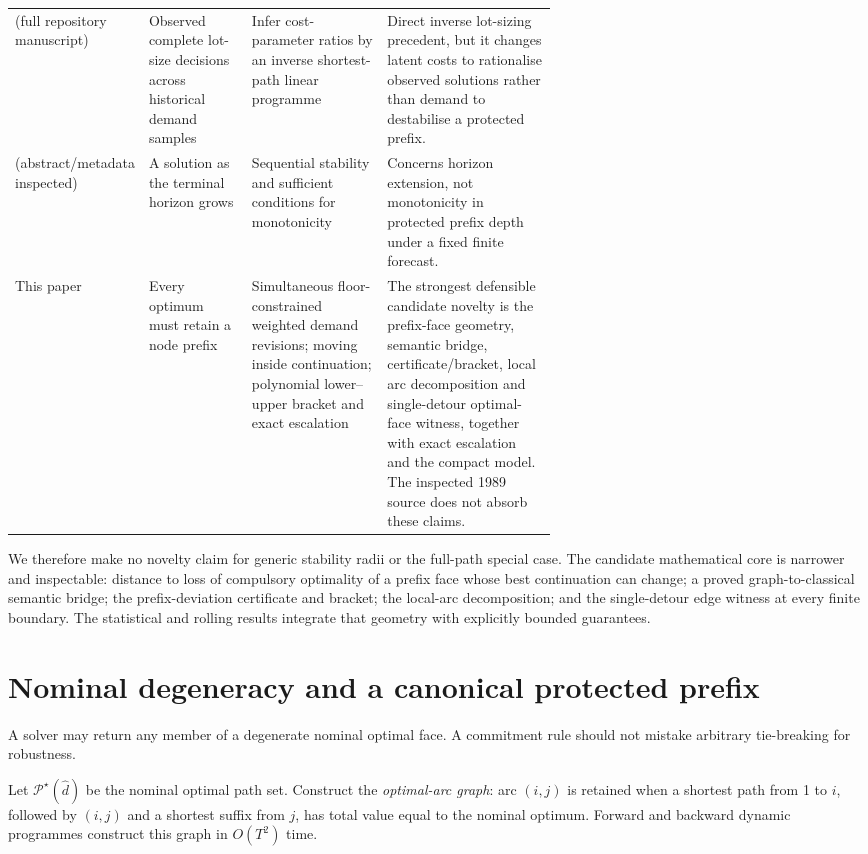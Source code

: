 \documentclass[11pt]{article}
\theoremstyle{definition}
\newcommand{\cP}{\mathcal{P}}
\newcommand{\dhat}{\widehat d}
\begin{document}
\begin{table}[t]
\begin{tabularx}{\linewidth}{@{}>{\raggedright\arraybackslash}p{0.19\linewidth}>{\raggedright\arraybackslash}p{0.19\linewidth}>{\raggedright\arraybackslash}p{0.25\linewidth}>{\raggedright\arraybackslash}X@{}}
\textcite{EgriEtAl2014} (full repository manuscript) & Observed complete lot-size decisions across historical demand samples & Infer cost-parameter ratios by an inverse shortest-path linear programme & Direct inverse lot-sizing precedent, but it changes latent costs to rationalise observed solutions rather than demand to destabilise a protected prefix. \\
\textcite{RichterWeber1994} (abstract/metadata inspected) & A solution as the terminal horizon grows & Sequential stability and sufficient conditions for monotonicity & Concerns horizon extension, not monotonicity in protected prefix depth under a fixed finite forecast. \\
This paper & Every optimum must retain a node prefix & Simultaneous floor-constrained weighted demand revisions; moving inside continuation; polynomial lower--upper bracket and exact escalation & The strongest defensible candidate novelty is the prefix-face geometry, semantic bridge, certificate/bracket, local arc decomposition and single-detour optimal-face witness, together with exact escalation and the compact model. The inspected 1989 source does not absorb these claims. \\
\bottomrule
\end{tabularx}
\end{table}

We therefore make no novelty claim for generic stability radii or the full-path special case. The candidate mathematical core is narrower and inspectable: distance to loss of compulsory optimality of a prefix face whose best continuation can change; a proved graph-to-classical semantic bridge; the prefix-deviation certificate and bracket; the local-arc decomposition; and the single-detour edge witness at every finite boundary. The statistical and rolling results integrate that geometry with explicitly bounded guarantees.

\section{Nominal degeneracy and a canonical protected prefix}\label{sec:degeneracy}

A solver may return any member of a degenerate nominal optimal face. A commitment rule should not mistake arbitrary tie-breaking for robustness.

Let $\cP^\star(\dhat)$ be the nominal optimal path set. Construct the \emph{optimal-arc graph}: arc $(i,j)$ is retained when a shortest path from 1 to $i$, followed by $(i,j)$ and a shortest suffix from $j$, has total value equal to the nominal optimum. Forward and backward dynamic programmes construct this graph in $O(T^2)$ time.
\end{document}
